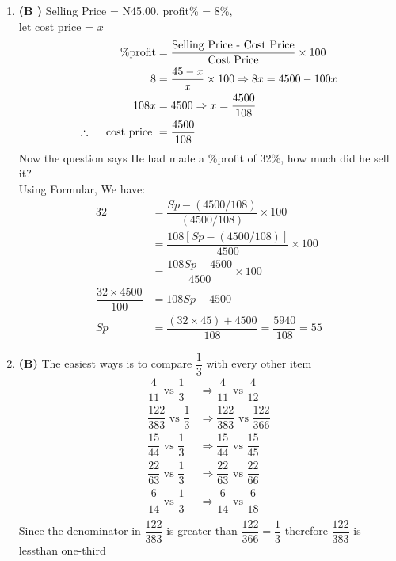 \begin{multicols}{2}
\begin{enumerate}[label={\arabic*.}]
    \item \textbf{\left(B \right)} Selling Price = N45.00, profit\% = 8\%, \\let cost price = \(x\)
    \begin{align*}
    \%\text{profit} &= \frac{\text{Selling Price - Cost Price} }{\text{Cost Price}} \times 100 \\
         8 &= \frac{45 - x }{x} \times 100 \Rightarrow 8x = 4500 -100x\\
       108x &= 4500 \Rightarrow x = \dfrac{4500}{108}  \\
       \therefore \hspace{10px}  \text{ cost price }  &= \dfrac{4500}{108} 
    \end{align*}
       Now the question says He had made a \%profit of 32\%, how much did he sell it? \\
       Using Formular, We have: \\
       \begin{align*}
        32 &= \dfrac{Sp - (4500/108)}{(4500/108)} \times 100 \\
        &= \dfrac{108\left[Sp - (4500/108)\right]}{4500} \times 100 \\
        &=  \dfrac{108Sp - 4500}{4500} \times 100 \\
        \dfrac{32 \times 4500}{100} &= 108Sp - 4500 \\
        Sp &= \dfrac{\left(32 \times 45\right) + 4500}{108} = \dfrac{5940}{108} = 55 
    \end{align*}

    \item \textbf{(B) }The easiest ways is to compare $\dfrac{1}{3}$ with every other item \\
        \begin{align*}
            \dfrac{4}{11} \text{ vs } \dfrac{1}{3} &\Rightarrow \dfrac{4}{11} \text{ vs } \dfrac{4}{12} \\
            \dfrac{122}{383} \text{ vs } \dfrac{1}{3} &\Rightarrow \dfrac{122}{383} \text{ vs } \dfrac{122}{366} \\
            \dfrac{15}{44} \text{ vs } \dfrac{1}{3} &\Rightarrow \dfrac{15}{44} \text{ vs } \dfrac{15}{45} \\
            \dfrac{22}{63} \text{ vs } \dfrac{1}{3} &\Rightarrow \dfrac{22}{63} \text{ vs } \dfrac{22}{66} \\
            \dfrac{6}{14} \text{ vs } \dfrac{1}{3} &\Rightarrow \dfrac{6}{14} \text{ vs } \dfrac{6}{18} \\
        \end{align*}
        Since the denominator in $\dfrac{122}{383}$ is greater than $\dfrac{122}{366} = \dfrac{1}{3}$ therefore $\dfrac{122}{383}$ is lessthan one-third


\end{enumerate}
\end{multicols}
